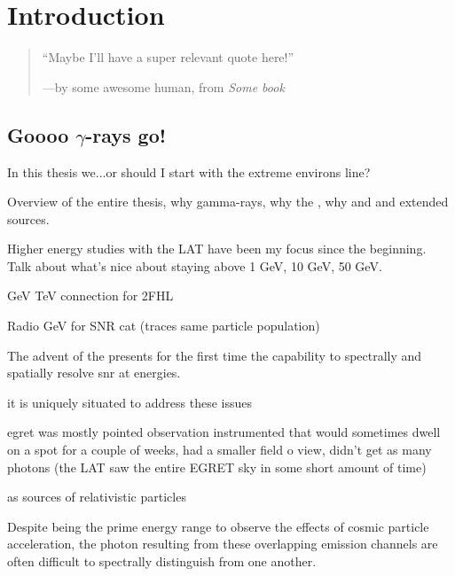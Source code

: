 \chapter{Introduction}
\label{chap:intro}

\begin{quote}
	``Maybe I'll have a super relevant quote here!'' 
	\begin{center}---by some awesome human, from \it{Some book} \end{center}
\end{quote}

\section{Goooo $\gamma$-rays go!}

In this thesis we...or should I start with the extreme environs line?

Overview of the entire thesis, why gamma-rays, why the \lat, why \snr and \pwn and extended sources.

Higher energy studies with the LAT have been my focus since the beginning. Talk about what's nice about staying above 1 GeV, 10 GeV, 50 GeV. 

GeV TeV connection for 2FHL

Radio GeV for SNR cat (traces same particle population)

The advent of the \lat presents for the first time the capability to spectrally and spatially resolve \gls{snr} at \gev energies.

it is uniquely situated to address these issues

egret was mostly pointed observation instrumented that would sometimes dwell on a spot for a couple of weeks, had a smaller field o view, didn't get as many photons (the LAT saw the entire EGRET sky in some short amount of time)

\snrs as sources of relativistic particles

Despite being the prime energy range to observe the effects of cosmic particle acceleration, the photon \sed{} resulting from these overlapping emission channels are often difficult to spectrally distinguish from one another. 

